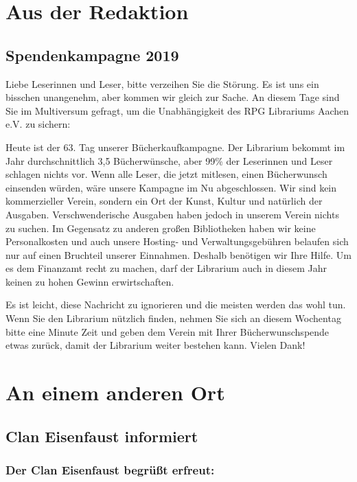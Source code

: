 \documentclass[]{multiversum}
\begin{document}
\makemultititle
%

\section{Aus der Redaktion}

\subsection{Spendenkampagne 2019}
Liebe Leserinnen und Leser, bitte verzeihen Sie die Störung. Es ist uns ein bisschen unangenehm, aber kommen wir gleich zur Sache. An diesem Tage sind Sie im Multiversum gefragt, um die Unabhängigkeit des RPG Librariums Aachen e.V. zu sichern:

Heute ist der 63. Tag unserer Bücherkaufkampagne. Der Librarium bekommt im Jahr durchschnittlich 3,5 Bücherwünsche, aber 99\% der Leserinnen und Leser schlagen nichts vor. Wenn alle Leser, die jetzt mitlesen, einen Bücherwunsch einsenden würden, wäre unsere Kampagne im Nu abgeschlossen.
Wir sind kein kommerzieller Verein, sondern ein Ort der Kunst, Kultur und natürlich der Ausgaben. Verschwenderische Ausgaben haben jedoch in unserem Verein nichts zu suchen. Im Gegensatz zu anderen großen Bibliotheken haben wir keine Personalkosten und auch unsere Hosting- und Verwaltungsgebühren belaufen sich nur auf einen Bruchteil unserer Einnahmen. Deshalb benötigen wir Ihre Hilfe. Um es dem Finanzamt recht zu machen, darf der Librarium auch in diesem Jahr keinen zu hohen Gewinn erwirtschaften.

Es ist leicht, diese Nachricht zu ignorieren und die meisten werden das wohl tun. Wenn Sie den Librarium nützlich finden, nehmen Sie sich an diesem Wochentag bitte eine Minute Zeit und geben dem Verein mit Ihrer Bücherwunschspende etwas zurück, damit der Librarium weiter bestehen kann. Vielen Dank!

\section{An einem anderen Ort}

\subsection{Clan Eisenfaust informiert}

\setsubsubsecheadstyle{\centering\bfseries}
\subsubsection{Der Clan Eisenfaust begrüßt erfreut:}
\end{document}

